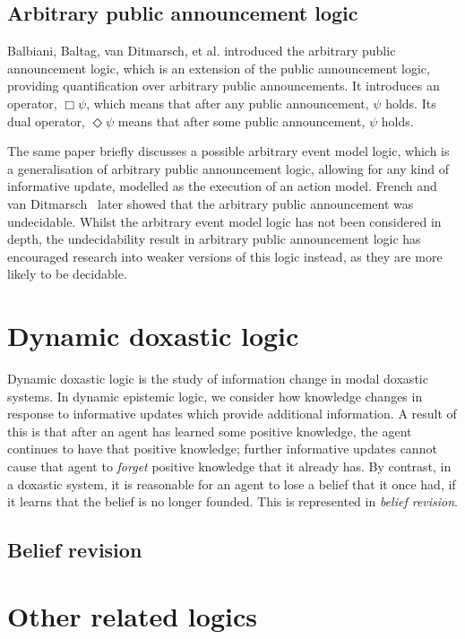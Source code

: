 \subsection{Arbitrary public announcement logic}

Balbiani, Baltag, van Ditmarsch, et al.\cite{balbiani2007arbitrary} introduced
the arbitrary public announcement logic, which is an extension of the public
announcement logic, providing quantification over arbitrary public
announcements. It introduces an operator, $\Box\psi$, which means that after any
public announcement, $\psi$ holds. Its dual operator, $\Diamond\psi$ means that
after some public announcement, $\psi$ holds.

The same paper briefly discusses a possible arbitrary event model logic, which
is a generalisation of arbitrary public announcement logic, allowing for any
kind of informative update, modelled as the execution of an action model. French
and van Ditmarsch~\cite{french2008undecidability} later showed that the
arbitrary public announcement was undecidable. Whilst the arbitrary event model
logic has not been considered in depth, the undecidability result in arbitrary
public announcement logic has encouraged research into weaker versions of this
logic instead, as they are more likely to be decidable.

\section{Dynamic doxastic logic}

Dynamic doxastic logic is the study of information change in modal doxastic
systems. In dynamic epistemic logic, we consider how knowledge changes in
response to informative updates which provide additional information. A result
of this is that after an agent has learned some positive knowledge, the agent
continues to have that positive knowledge; further informative updates cannot
cause that agent to {\em forget} positive knowledge that it already has. By
contrast, in a doxastic system, it is reasonable for an agent to lose a belief
that it once had, if it learns that the belief is no longer founded. This is
represented in {\em belief revision}.

\subsection{Belief revision}


\section{Other related logics}

